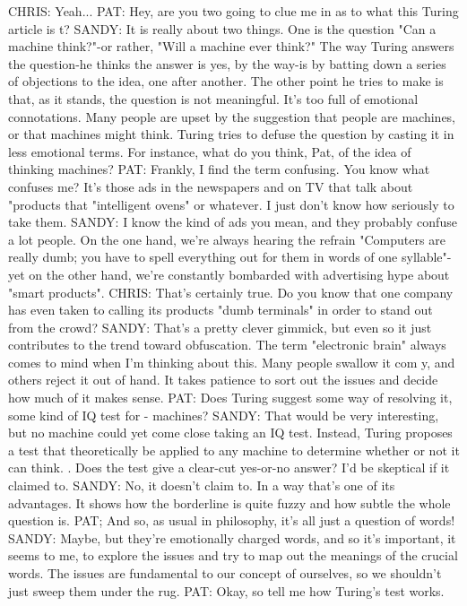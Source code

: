 CHRIS: Yeah...
PAT: Hey, are you two going to clue me in as to what this Turing article is t?
SANDY: It is really about two things. One is the question "Can a machine think?"-or
   rather, "Will a machine ever think?" The way Turing answers the question-he
   thinks the answer is yes, by the way-is by batting down a series of objections to
   the idea, one after another. The other point he tries to make is that, as it stands,
   the question is not meaningful. It's too full of emotional connotations. Many
   people are upset by the suggestion that people are machines, or that machines
   might think. Turing tries to defuse the question by casting it in less emotional
   terms. For instance, what do you think, Pat, of the idea of thinking machines?
PAT: Frankly, I find the term confusing. You know what confuses me? It's those ads
   in the newspapers and on TV that talk about "products that "intelligent ovens" or
   whatever. I just don't know how seriously to take them.
SANDY: I know the kind of ads you mean, and they probably confuse a lot people.
   On the one hand, we're always hearing the refrain "Computers are really dumb;
   you have to spell everything out for them in words of one syllable"-yet on the
   other hand, we're constantly bombarded with advertising hype about "smart
   products".
CHRIS: That's certainly true. Do you know that one company has even taken to
   calling its products "dumb terminals" in order to stand out from the crowd?
SANDY: That's a pretty clever gimmick, but even so it just contributes to the trend
   toward obfuscation. The term "electronic brain" always comes to mind when I'm
   thinking about this. Many people swallow it com y, and others reject it out of
   hand. It takes patience to sort out the issues and decide how much of it makes
   sense.
PAT: Does Turing suggest some way of resolving it, some kind of IQ test for -
   machines?
SANDY: That would be very interesting, but no machine could yet come close taking
   an IQ test. Instead, Turing proposes a test that theoretically be applied to any
   machine to determine whether or not it can think. . Does the test give a clear-cut
   yes-or-no answer? I'd be skeptical if it claimed to.
SANDY: No, it doesn't claim to. In a way that's one of its advantages. It shows how
   the borderline is quite fuzzy and how subtle the whole question is. PAT; And so,
   as usual in philosophy, it's all just a question of words!
SANDY: Maybe, but they're emotionally charged words, and so it's important, it
   seems to me, to explore the issues and try to map out the meanings of the crucial
   words. The issues are fundamental to our concept of ourselves, so we shouldn't
   just sweep them under the rug.
PAT: Okay, so tell me how Turing's test works.




